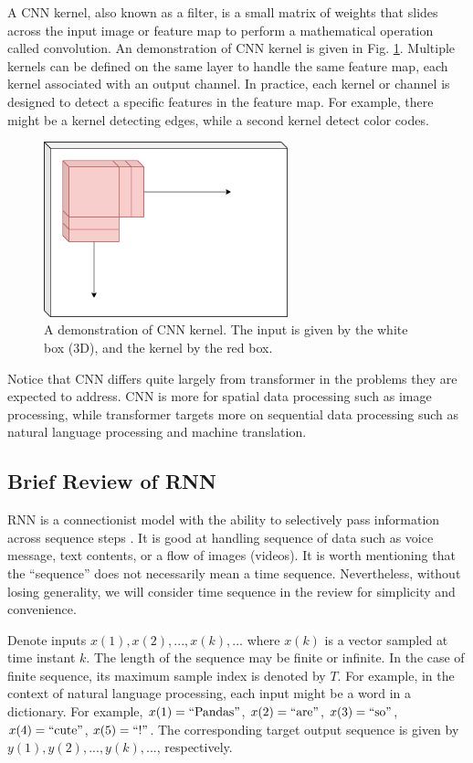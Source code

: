 A CNN kernel, also known as a filter, is a small matrix of weights that slides across the input image or feature map to perform a mathematical operation called convolution. An demonstration of CNN kernel is given in Fig. \ref{ch:transformerbasics:fig:cnn_kernel}. Multiple kernels can be defined on the same layer to handle the same feature map, each kernel associated with an output channel. In practice, each kernel or channel is designed to detect a specific features in the feature map. For example, there might be a kernel detecting edges, while a second kernel detect color codes.

\begin{figure}
	\centering
	\includegraphics[width=200pt]{chapters/ch-transformer/figs/cnn_kernel.png}
	\caption{A demonstration of CNN kernel. The input is given by the white box (3D), and the kernel by the red box.} \label{ch:transformerbasics:fig:cnn_kernel}
\end{figure}

Notice that CNN differs quite largely from transformer in the problems they are expected to address. CNN is more for spatial data processing such as image processing, while transformer targets more on sequential data processing such as natural language processing and machine translation.

\subsection{Brief Review of RNN}

RNN is a connectionist model with the ability to selectively pass information across sequence steps \cite{lipton2015critical}. It is good at handling sequence of data such as voice message, text contents, or a flow of images (videos). It is worth mentioning that the ``sequence'' does not necessarily mean a time sequence. Nevertheless, without losing generality, we will consider time sequence in the review for simplicity and convenience.

Denote inputs $x(1), x(2), ..., x(k), ...$ where $x(k)$ is a vector sampled at time instant $k$. The length of the sequence may be finite or infinite. In the case of finite sequence, its maximum sample index is denoted by $T$. For example, in the context of natural language processing, each input might be a word in a dictionary. For example, $x(1) = \textup{``Pandas''}$, $x(2)=\textup{``are''}$, $x(3)=\textup{``so''}$, $x(4)=\textup{``cute''}$, $x(5)=\textup{``!''}$. The corresponding target output sequence is given by $y(1), y(2), ..., y(k), ...$, respectively.

